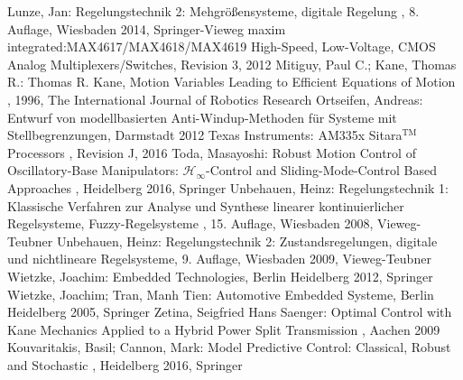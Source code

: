 \begin{thebibliography}{999}
 Lunze, Jan: \glqq Regelungstechnik 2: Mehgrößensysteme, digitale Regelung \grqq , 8. Auflage, Wiesbaden 2014, Springer-Vieweg
 maxim integrated:\glqq MAX4617/MAX4618/MAX4619 High-Speed, Low-Voltage, CMOS Analog Multiplexers/Switches\grqq, Revision 3, 2012
 Mitiguy, Paul C.; Kane, Thomas R.: Thomas R. Kane, \glqq Motion Variables Leading to Efficient Equations of Motion \grqq , 1996, The International Journal of Robotics Research
 Ortseifen, Andreas: \glqq Entwurf von modellbasierten Anti-Windup-Methoden für Systeme mit Stellbegrenzungen\grqq, Darmstadt 2012
 Texas Instruments: \glqq AM335x Sitara$^{\text{TM}}$ Processors \grqq, Revision J, 2016
 Toda, Masayoshi: \glqq Robust Motion Control of Oscillatory-Base Manipulators: $\mathcal{H}_\infty$-Control and Sliding-Mode-Control Based Approaches \grqq , Heidelberg 2016, Springer
 Unbehauen, Heinz: \glqq Regelungstechnik 1: Klassische Verfahren zur Analyse und Synthese linearer kontinuierlicher Regelsysteme, Fuzzy-Regelsysteme \grqq , 15. Auflage, Wiesbaden 2008, Vieweg-Teubner
 Unbehauen, Heinz: \glqq Regelungstechnik 2: Zustandsregelungen, digitale und nichtlineare Regelsysteme\grqq , 9. Auflage, Wiesbaden 2009, Vieweg-Teubner
 Wietzke, Joachim: \glqq Embedded Technologies\grqq , Berlin Heidelberg 2012, Springer
 Wietzke, Joachim; Tran, Manh Tien: \glqq Automotive Embedded Systeme\grqq , Berlin Heidelberg 2005, Springer
 Zetina, Seigfried Hans Saenger: \glqq Optimal Control with Kane Mechanics Applied to a Hybrid Power Split Transmission \grqq , Aachen 2009
 Kouvaritakis, Basil; Cannon, Mark: \glqq Model Predictive Control: Classical, Robust and Stochastic \grqq , Heidelberg 2016, Springer




\end{thebibliography}
